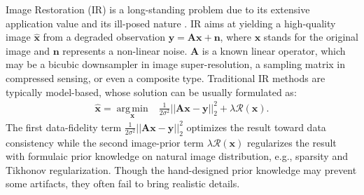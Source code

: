 \documentclass{article} \usepackage{iclr2023_conference,times}
\begin{document}
\def\thefootnote{*}
\vspace{-0.2cm}

Image Restoration (IR) is a long-standing problem due to its extensive application value and its ill-posed nature \citep{richardson1972bayesian,andrews1977digital}. IR aims at yielding a high-quality image $\hat{\mathbf{x}}$ from a degraded observation $\mathbf{y}=\mathbf{A}\mathbf{x}+\mathbf{n}$, where $\mathbf{x}$ stands for the original image and $\mathbf{n}$ represents a non-linear noise. $\mathbf{A}$ is a known linear operator, which may be a bicubic downsampler in image super-resolution, a sampling matrix in compressed sensing, or even a composite type. Traditional IR methods are typically model-based, whose solution can be usually formulated as:
\begin{equation}
\begin{aligned}
    \hat{\mathbf{x}}=\underset{\mathbf{x}}{\operatorname{arg\, min}}
    &\frac{1}{2\sigma^{2}}||\mathbf{A}\mathbf{x}-\mathbf{y}||_{2}^{2}+\lambda \mathcal{R}(\mathbf{x}).
    \label{eq:traditional}
\end{aligned}
\end{equation}
The first data-fidelity term $\frac{1}{2\sigma^{2}}||\mathbf{A}\mathbf{x}-\mathbf{y}||_{2}^{2}$ optimizes the result toward data consistency while the second image-prior term $\lambda \mathcal{R}(\mathbf{x})$ regularizes the result with formulaic prior knowledge on natural image distribution, e.g., sparsity and Tikhonov regularization. Though the hand-designed prior knowledge may prevent some artifacts, they often fail to bring realistic details. 
\end{document}
